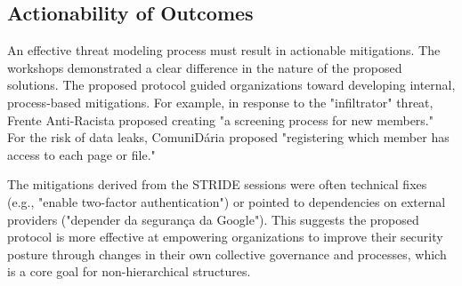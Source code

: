 \subsection{Actionability of Outcomes}
\label{subsec:actionability_outcomes}

An effective threat modeling process must result in actionable mitigations. The workshops
demonstrated a clear difference in the nature of the proposed solutions. The proposed
protocol guided organizations toward developing internal, process-based mitigations. For
example, in response to the "infiltrator" threat, Frente Anti-Racista proposed creating
"a screening process for new members." For the risk of data leaks, ComuniDária proposed
"registering which member has access to each page or file."

The mitigations derived from the STRIDE sessions were often technical fixes (e.g., "enable
two-factor authentication") or pointed to dependencies on external providers ("depender da
segurança da Google"). This suggests the proposed protocol is more effective at empowering
organizations to improve their security posture through changes in their own collective
governance and processes, which is a core goal for non-hierarchical structures.

\section*{}

